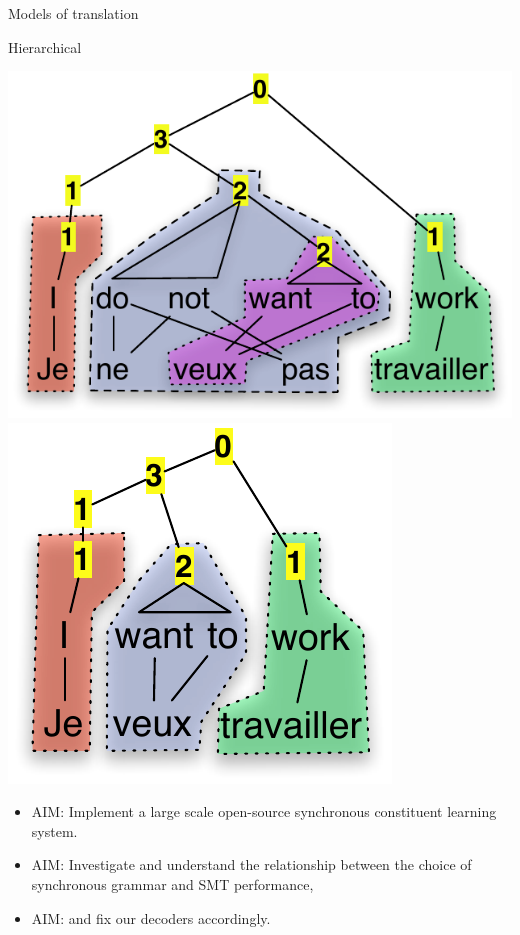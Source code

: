 \documentclass{beamer}
\begin{document}
\begin{frame}[t]{Models of translation}
\begin{block}{Hierarchical}
  \begin{center}
    \includegraphics[scale=0.55]{JeNeVeuxPasTravailler-Hiero-labelled.pdf}
    \hspace{0.3in}
    \includegraphics[scale=0.55]{JeVeuxTravailler-Hiero-labelled.pdf}
  \end{center}
\end{block}
\begin{itemize}
\item \alert{AIM: Implement a large scale open-source synchronous constituent learning system.} 
\item \alert{AIM: Investigate and understand the relationship between the choice of synchronous grammar and SMT performance,} 
\item \alert{AIM: and fix our decoders accordingly.} 
\end{itemize}
\end{frame}
\end{document}

